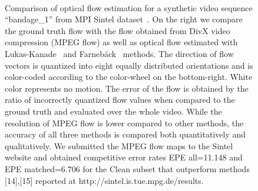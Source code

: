\documentclass[10pt,twocolumn,letterpaper]{article}
\begin{document}
\begin{figure}[t!]
\begin{center}
\begin{tabular}{p{}p{}p{}}
\end{tabular}
\caption{Comparison of optical flow estimation for a synthetic video sequence ``bandage\_1'' from MPI Sintel dataset~\cite{Butler12}. On the right we compare the ground truth flow with the flow obtained from DivX video compression (MPEG flow) as well as optical flow estimated with Lukas-Kanade~\cite{Lucas81} and Farneb\"ack~\cite{Farneback03} methods. The direction of flow vectors is quantized into eight equally distributed orientations and is color-coded according to the color-wheel on the bottom-right. White color represents no motion. The error of the flow is obtained by the ratio of incorrectly quantized flow values when compared to the ground truth and evaluated over the whole video. While the resolution of MPEG flow is lower compared to other methods, the accuracy of all three methods is compared both quantitatively and qualitatively. We submitted the MPEG flow maps to the Sintel website and obtained competitive error rates EPE all=11.148 and EPE matched=6.706 for the Clean subset that outperform methods [14],[15] reported at http://sintel.is.tue.mpg.de/results. 
}
\mbox{}\vspace{-.6cm}\\
\label{fig:flow1}
\end{center}
\end{figure}
\end{document}
